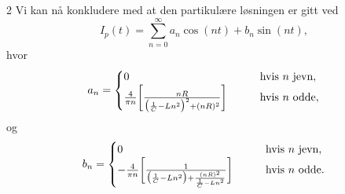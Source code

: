 \documentclass{article}
\theoremstyle{definition}
\newenvironment{customoppg}[1]
{\renewcommand\theinnercustomoppg{#1}\innercustomoppg}
{\endinnercustomoppg}
\theoremstyle{remark}
\begin{document}
\begin{multicols*}{2}
\begin{customoppg}{11}
Vi kan nå konkludere med at den partikulære løsningen er gitt ved
\begin{equation*}
    I_p(t) = \sum_{n = 0}^{\infty} a_n \cos(n t) + b_n \sin(n t),
\end{equation*}
hvor
\begin{equation*}
    a_n =
    \begin{cases}
        0 & \qquad \textnormal{hvis } n \textnormal{ jevn}, \\
        \frac{4}{\pi n} \bigg[ \frac{nR}{\big(\frac{1}{C} - Ln^2\big)^2 + (nR)^2} \bigg] & \qquad \textnormal{hvis } n \textnormal{ odde},
    \end{cases}
\end{equation*}
og
\begin{equation*}
    b_n =
    \begin{cases}
        0 & \qquad \textnormal{hvis } n \textnormal{ jevn}, \\
        -\frac{4}{\pi n} \bigg[ \frac{1}{\big(\frac{1}{C} - Ln^2\big) + \frac{(n R)^2}{\frac{1}{C} - Ln^2}} \bigg] & \qquad \textnormal{hvis } n \textnormal{ odde}.
    \end{cases}
\end{equation*}
\end{customoppg}



\end{multicols*}
\end{document}
